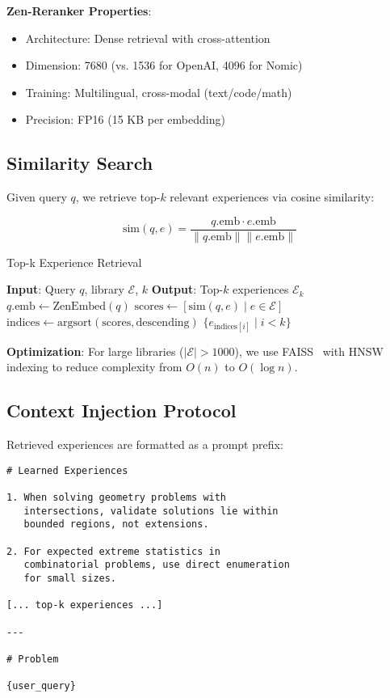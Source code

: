 \documentclass[11pt,letterpaper]{article}
\begin{document}
\textbf{Zen-Reranker Properties}:
\begin{itemize}
    \item Architecture: Dense retrieval with cross-attention
    \item Dimension: 7680 (vs. 1536 for OpenAI, 4096 for Nomic)
    \item Training: Multilingual, cross-modal (text/code/math)
    \item Precision: FP16 (15 KB per embedding)
\end{itemize}

\subsection{Similarity Search}

Given query $q$, we retrieve top-$k$ relevant experiences via cosine similarity:

\begin{equation}
\text{sim}(q, e) = \frac{q.\text{emb} \cdot e.\text{emb}}{\|q.\text{emb}\| \|e.\text{emb}\|}
\end{equation}

\begin{algorithm}[t]
\caption{Top-k Experience Retrieval}
\label{alg:retrieval}
\begin{algorithmic}[1]
\STATE \textbf{Input}: Query $q$, library $\mathcal{E}$, $k$
\STATE \textbf{Output}: Top-$k$ experiences $\mathcal{E}_k$
\STATE $q.\text{emb} \leftarrow \text{ZenEmbed}(q)$
\STATE $\text{scores} \leftarrow [\text{sim}(q, e) \mid e \in \mathcal{E}]$
\STATE $\text{indices} \leftarrow \text{argsort}(\text{scores}, \text{descending})$
\RETURN $\{e_{\text{indices}[i]} \mid i < k\}$
\end{algorithmic}
\end{algorithm}

\textbf{Optimization}: For large libraries ($|\mathcal{E}| > 1000$), we use FAISS~\cite{johnson2019billion} with HNSW indexing to reduce complexity from $O(n)$ to $O(\log n)$.

\subsection{Context Injection Protocol}

Retrieved experiences are formatted as a prompt prefix:

\begin{lstlisting}[caption=Context Injection Template]
# Learned Experiences

1. When solving geometry problems with 
   intersections, validate solutions lie within 
   bounded regions, not extensions.

2. For expected extreme statistics in 
   combinatorial problems, use direct enumeration 
   for small sizes.

[... top-k experiences ...]

---

# Problem

{user_query}
\end{lstlisting}
\end{document}
